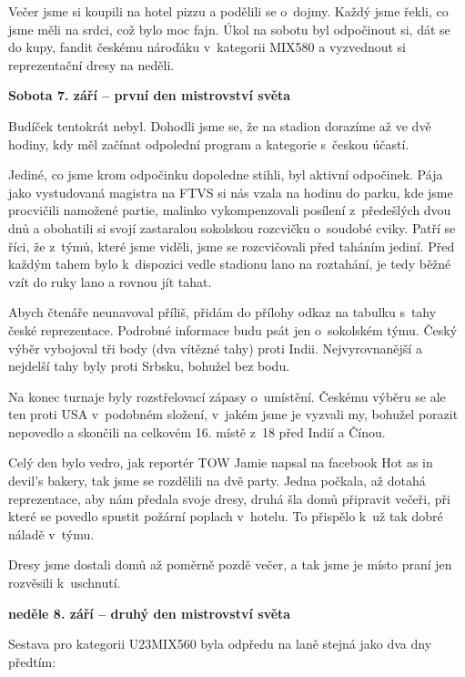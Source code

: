 \documentclass[11pt]{article}
\begin{document}
Večer jsme si koupili na hotel pizzu a podělili se o~dojmy. Každý jsme řekli, co jsme měli na srdci, což bylo moc fajn. Úkol na sobotu byl odpočinout si, dát se do kupy, fandit českému nároďáku v~kategorii MIX580 a vyzvednout si reprezentační dresy na neděli.


\vspace*{12pt}
\noindent\textbf{Sobota 7. září – první den mistrovství světa}
\vspace*{6pt}

\noindent
Budíček tentokrát nebyl. Dohodli jsme se, že na stadion dorazíme až ve dvě hodiny, kdy měl začínat odpolední program a kategorie s~českou účastí.

Jediné, co jsme krom odpočinku dopoledne stihli, byl aktivní odpočinek. Pája jako vystudovaná magistra na FTVS si nás vzala na hodinu do parku, kde jsme procvičili namožené partie, malinko vykompenzovali posílení z~předešlých dvou dnů a obohatili si svojí zastaralou sokolskou rozcvičku o~soudobé cviky.
Patří se říci, že z~týmů, které jsme viděli, jsme se rozcvičovali před taháním jediní. Před každým tahem bylo k~dispozici vedle stadionu lano na roztahání, je tedy běžné vzít do ruky lano a rovnou jít tahat.

Abych čtenáře neunavoval příliš, přidám do přílohy odkaz na tabulku s~tahy české reprezentace. Podrobné informace budu psát jen o~sokolském týmu. Český výběr vybojoval tři body (dva vítězné tahy) proti Indii. Nejvyrovnanější a nejdelší tahy byly proti Srbsku, bohužel bez bodu.

Na konec turnaje byly rozstřelovací zápasy o~umístění. Českému výběru se ale ten proti USA v~podobném složení, v~jakém jsme je vyzvali my, bohužel porazit nepovedlo a skončili na celkovém 16. místě z~18 před Indií a Čínou.

Celý den bylo vedro, jak reportér TOW Jamie napsal na facebook \luv{}Hot as in devil's bakery\ruv{}, tak jsme se rozdělili na dvě party. Jedna počkala, až dotahá reprezentace, aby nám předala svoje dresy, druhá šla domů připravit večeři, při které se povedlo spustit požární poplach v~hotelu. To přispělo k~už tak dobré náladě v~týmu.

Dresy jsme dostali domů až poměrně pozdě večer, a tak jsme je místo praní jen rozvěsili k~uschnutí.


\vspace*{20pt}
\noindent\textbf{neděle 8. září – druhý den mistrovství světa}
\vspace*{6pt}

\noindent
Sestava pro kategorii U23MIX560 byla odpředu na laně stejná jako dva dny předtím:
\end{document}
